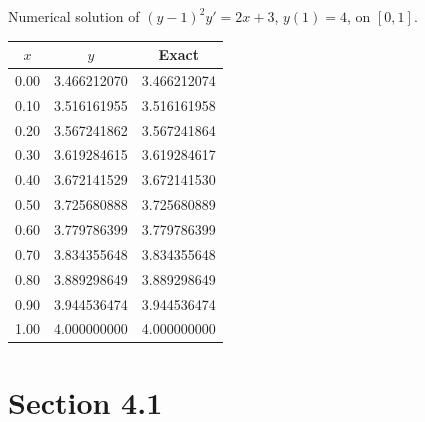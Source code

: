 \begin{examplesolution}
\begin{newtable}
  \label{table:3.3.6} Numerical solution of $(y-1)^{2}y'=2x+3$, $y(1)=4$, on $[0,1]$.
  \begin{center}
    \begin{tabular}{|r|r|r|}
      \hline
      \multicolumn{1}{|c|}{$x$} & \multicolumn{1}{|c|}{$y$} & \multicolumn{1}{|c|}{Exact} \\
      \hline
      0.00                      & 3.466212070               & 3.466212074                 \\
      0.10                      & 3.516161955               & 3.516161958                 \\
      0.20                      & 3.567241862               & 3.567241864                 \\
      0.30                      & 3.619284615               & 3.619284617                 \\
      0.40                      & 3.672141529               & 3.672141530                 \\
      0.50                      & 3.725680888               & 3.725680889                 \\
      0.60                      & 3.779786399               & 3.779786399                 \\
      0.70                      & 3.834355648               & 3.834355648                 \\
      0.80                      & 3.889298649               & 3.889298649                 \\
      0.90                      & 3.944536474               & 3.944536474                 \\
      1.00                      & 4.000000000               & 4.000000000                 \\
      \hline
    \end{tabular}
  \end{center}
\end{newtable}
\end{examplesolution}

\section*{Section 4.1}
{}
\setcounter{chapter}{4}
\setcounter{section}{1}

